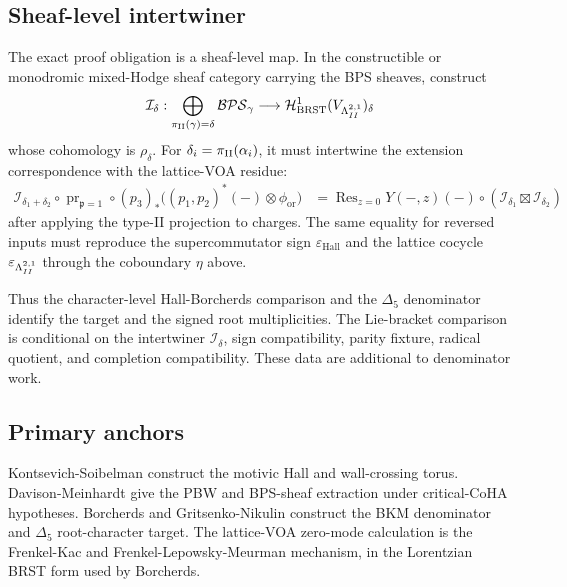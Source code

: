 \subsection*{Sheaf-level intertwiner}

The exact proof obligation is a sheaf-level map.  In the constructible
or monodromic mixed-Hodge sheaf category carrying the BPS sheaves,
construct
\[
  \mathcal I_\delta:
  \bigoplus_{\pi_{\mathrm{II}}(\gamma)=\delta}\mathcal{BPS}_\gamma
  \longrightarrow
  \mathcal H^1_{\mathrm{BRST}}(V_{\Lambda^{2,1}_{II}})_\delta
\]
whose cohomology is \(\rho_\delta\).  For
\(\delta_i=\pi_{\mathrm{II}}(\alpha_i)\), it must intertwine the extension
correspondence with the lattice-VOA residue:
\[
\begin{aligned}
  \mathcal I_{\delta_1+\delta_2}\circ
  \operatorname{pr}_{\mathfrak p=1}\circ
  (p_3)_*
  \bigl((p_1,p_2)^*(-)\otimes\phi_{\mathrm{or}}\bigr)
  &=
  \operatorname{Res}_{z=0}
  Y(-,z)(-)\circ
  (\mathcal I_{\delta_1}\boxtimes\mathcal I_{\delta_2})
\end{aligned}
\]
after applying the type-II projection to charges.  The same equality
for reversed inputs must reproduce the supercommutator sign
\(\varepsilon_{\mathrm{Hall}}\) and the lattice cocycle
\(\varepsilon_{\Lambda^{2,1}_{II}}\) through the coboundary \(\eta\) above.

Thus the character-level Hall-Borcherds comparison and the
\(\Delta_5\) denominator identify the target and the signed root
multiplicities.  The Lie-bracket comparison is conditional on the
intertwiner \(\mathcal I_\delta\), sign compatibility, parity fixture,
radical quotient, and completion compatibility.  These data are
additional to denominator work.

\subsection*{Primary anchors}

Kontsevich-Soibelman construct the motivic Hall and wall-crossing
torus.  Davison-Meinhardt give the PBW and BPS-sheaf extraction under
critical-CoHA hypotheses.  Borcherds and Gritsenko-Nikulin construct
the BKM denominator and \(\Delta_5\) root-character target.  The
lattice-VOA zero-mode calculation is the Frenkel-Kac and
Frenkel-Lepowsky-Meurman mechanism, in the Lorentzian BRST form used by
Borcherds.

